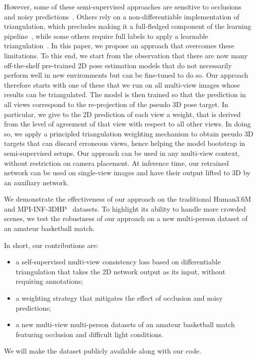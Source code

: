 \documentclass[runningheads]{llncs}
\begin{document}
However, some of these semi-supervised approaches are sensitive to occlusions and noisy predictions~\cite{Rhodin18a,Mitra20}. Others rely on a non-differentiable implementation of triangulation, which precludes making it a full-fledged component of the learning pipeline~\cite{Kocabas19}, while some others require full labels to apply a learnable triangulation~\cite{Iskakov19}. 
In this paper, we propose an approach that overcomes these limitations. To this end, we start from the observation that there are now many off-the-shelf pre-trained 2D pose estimation models that do not necessarily perform well in new environments but can be fine-tuned to do so. Our approach therefore starts with one of these that we run on all multi-view images whose results can be triangulated. The model is then trained so that the prediction in all views correspond to the re-projection of the pseudo 3D pose target. In particular, we give to the 2D prediction of each view a weight, that is derived from the level of agreement of that view with respect to all other views. In doing so, we apply a principled triangulation weighting mechanism to obtain pseudo 3D targets that can discard erroneous views, hence helping the model bootstrap in semi-supervised setups. Our approach can be used in any multi-view context, without restriction on camera placement. At inference time, our retrained network can be used on single-view images and have their output lifted to 3D by an auxiliary network. 

We demonstrate the effectiveness of our approach on the traditional Human3.6M~\cite{Ionescu14a} and MPI-INF-3DHP~\cite{Mehta17a} datasets. To highlight its ability to handle more crowded scenes, we test the robustness of our approach on a new multi-person dataset of an amateur basketball match. 

In short, our contributions are:
\begin{itemize}
\item a self-supervised multi-view consistency loss based on differentiable triangulation that takes the 2D network output as its input, without requiring annotations;
\item a weighting strategy that mitigates the effect of occlusion and noisy predictions;
\item a new multi-view multi-person datasets of an amateur basketball match featuring occlusion and difficult light conditions.
\end{itemize}
We will make the dataset publicly available along with our code. 
\end{document}
